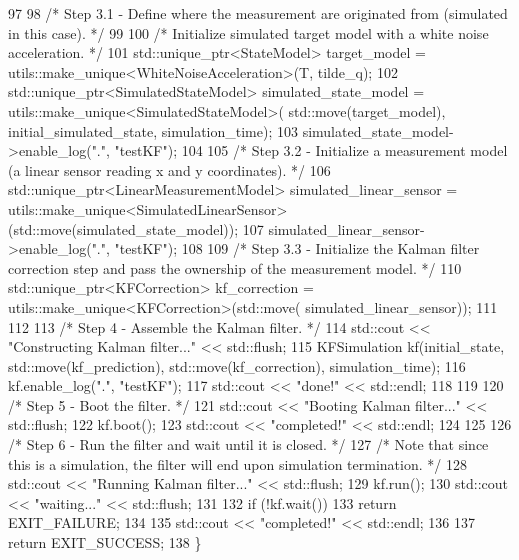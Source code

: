 \begin{DoxyCodeInclude}
97 
98     \textcolor{comment}{/* Step 3.1 - Define where the measurement are originated from (simulated in this case). */}
99 
100     \textcolor{comment}{/* Initialize simulated target model with a white noise acceleration. */}
101     std::unique\_ptr<StateModel> target\_model = utils::make\_unique<WhiteNoiseAcceleration>(T, tilde\_q);
102     std::unique\_ptr<SimulatedStateModel> simulated\_state\_model = utils::make\_unique<SimulatedStateModel>(
      std::move(target\_model), initial\_simulated\_state, simulation\_time);
103     simulated\_state\_model->enable\_log(\textcolor{stringliteral}{"."}, \textcolor{stringliteral}{"testKF"});
104 
105     \textcolor{comment}{/* Step 3.2 - Initialize a measurement model (a linear sensor reading x and y coordinates). */}
106     std::unique\_ptr<LinearMeasurementModel> simulated\_linear\_sensor = 
      utils::make\_unique<SimulatedLinearSensor>(std::move(simulated\_state\_model));
107     simulated\_linear\_sensor->enable\_log(\textcolor{stringliteral}{"."}, \textcolor{stringliteral}{"testKF"});
108 
109     \textcolor{comment}{/* Step 3.3 - Initialize the Kalman filter correction step and pass the ownership of the measurement
       model. */}
110     std::unique\_ptr<KFCorrection> kf\_correction = utils::make\_unique<KFCorrection>(std::move(
      simulated\_linear\_sensor));
111 
112 
113     \textcolor{comment}{/* Step 4 - Assemble the Kalman filter. */}
114     std::cout << \textcolor{stringliteral}{"Constructing Kalman filter..."} << std::flush;
115     KFSimulation kf(initial\_state, std::move(kf\_prediction), std::move(kf\_correction), simulation\_time);
116     kf.enable\_log(\textcolor{stringliteral}{"."}, \textcolor{stringliteral}{"testKF"});
117     std::cout << \textcolor{stringliteral}{"done!"} << std::endl;
118 
119 
120     \textcolor{comment}{/* Step 5 - Boot the filter. */}
121     std::cout << \textcolor{stringliteral}{"Booting Kalman filter..."} << std::flush;
122     kf.boot();
123     std::cout << \textcolor{stringliteral}{"completed!"} << std::endl;
124 
125 
126     \textcolor{comment}{/* Step 6 - Run the filter and wait until it is closed. */}
127     \textcolor{comment}{/* Note that since this is a simulation, the filter will end upon simulation termination. */}
128     std::cout << \textcolor{stringliteral}{"Running Kalman filter..."} << std::flush;
129     kf.run();
130     std::cout << \textcolor{stringliteral}{"waiting..."} << std::flush;
131 
132     \textcolor{keywordflow}{if} (!kf.wait())
133         \textcolor{keywordflow}{return} EXIT\_FAILURE;
134 
135     std::cout << \textcolor{stringliteral}{"completed!"} << std::endl;
136 
137     \textcolor{keywordflow}{return} EXIT\_SUCCESS;
138 \}
\end{DoxyCodeInclude}
 